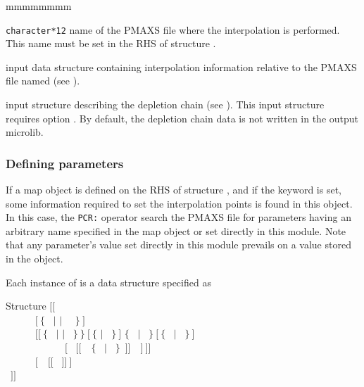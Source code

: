 \begin{ListeDeDescription}{mmmmmmmm}
\item[\dusa{PMAX}] {\tt character*12} name of the PMAXS file where the interpolation is performed. This name must be set in the RHS of structure .

\item[\dusa{descintf}] input data structure containing interpolation information relative to the PMAXS file named  (see ).

\item[\dstr{descdepl}] input structure describing the depletion chain (see ). This input structure requires option . By
default, the depletion chain data is not written in the output {\sc microlib}.

\end{ListeDeDescription}

\subsubsection{Defining parameters}\label{sect:descintf}

If a {\sc map} object is defined on the RHS of structure , and if the  keyword is set, some information required to set the interpolation points is found in this object. In this case, the {\tt PCR:} operator search the PMAXS file for parameters having an arbitrary name specified in the {\sc map} object or set directly in  this module. Note that any parameter's value set directly in this module prevails on a value stored in the  object.

Each instance of  is a data structure specified as

\begin{DataStructure}{Structure }
$[[$~  \\
~~~~~~$[~\{$~ $|$  $|$ ~~$\}~]$ \\
~~~~~~$[[~\{$~ $|$  $|$ ~$\}~\}~[~\{$  $|$ ~$\}~]$  $\{$~ $|$ ~$\}~[~\{$~ $|$ ~$\}~]$ \\
~~~~~~~~~~~~$[$~ $[[$~~$\{$~ $|$ ~$\}$~$]]$~~$]~]]$  \\
~~~~~~$[$~~$[[$~  $]]~]$ \\
~$]]$
\end{DataStructure}

